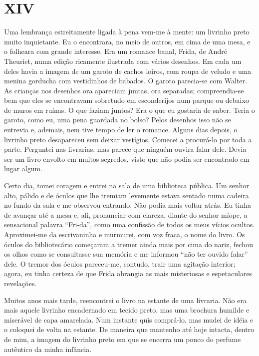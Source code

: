 \chapter*{\centering\Large{XIV}}

Uma lembrança estreitamente ligada à pena vem-me à mente: um livrinho preto muito inquietante. Eu o encontrara, no meio de outros, em cima de uma mesa, e o folheara com grande interesse. Era um romance banal, Frida, de André Theuriet, numa edição ricamente ilustrada com vários desenhos. Em cada um deles havia a imagem de um garoto de cachos loiros, com roupa de veludo e uma menina gorducha com vestidinhos de babados. O garoto parecia-se com Walter. As crianças nos desenhos ora apareciam juntas, ora separadas; compreendia-se bem que eles se encontravam sobretudo em esconderijos num parque ou debaixo de muros em ruínas. O que faziam juntos? Era o que eu gostaria de saber. Teria o garoto, como eu, uma pena guardada no bolso? Pelos desenhos isso não se entrevia e, ademais, nem tive tempo de ler o romance. Alguns dias depois, o livrinho preto desapareceu sem deixar vestígios. Comecei a procurá-lo por toda a parte. Perguntei nas livrarias, mas parece que ninguém ouvira falar dele. Devia ser um livro envolto em muitos segredos, visto que não podia ser encontrado em lugar algum.

Certo dia, tomei coragem e entrei na sala de uma biblioteca pública. Um senhor alto, pálido e de óculos que lhe tremiam levemente estava sentado numa cadeira no fundo da sala e me observou entrando. Não podia mais voltar atrás. Eu tinha de avançar até a mesa e, ali, pronunciar com clareza, diante do senhor míope, a sensacional palavra ``Fri-da'', como uma confissão de todos os meus vícios ocultos. Aproximei-me da escrivaninha e murmurei, com voz fraca, o nome do livro. Os óculos do bibliotecário começaram a tremer ainda mais por cima do nariz, fechou os olhos como se consultasse sua memória e me informou ``não ter ouvido falar'' dele. O tremor dos óculos pareceu-me, contudo, trair uma agitação interior; agora, eu tinha certeza de que Frida abrangia as mais misteriosas e espetaculares revelações.

Muitos anos mais tarde, reencontrei o livro na estante de uma livraria. Não era mais aquele livrinho encadernado em tecido preto, mas uma brochura humilde e miserável de capa amarelada. Num instante quis comprá-lo, mas mudei de idéia e o coloquei de volta na estante. De maneira que mantenho até hoje intacta, dentro de mim, a imagem do livrinho preto em que se encerra um pouco do perfume autêntico da minha infância.


